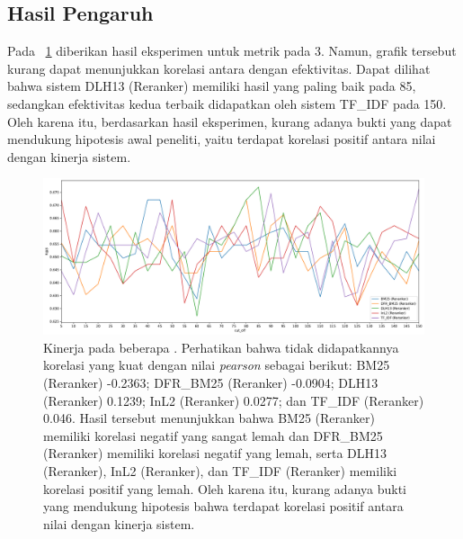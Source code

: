 \subsection{Hasil Pengaruh \Cutoff{}}
\label{subbab:5::Hasil Pengaruh Cut-off}
Pada \gambar{}~\ref{grafik:cutoff} diberikan hasil eksperimen untuk metrik \recall{} pada \cutoff{} 3. Namun, grafik tersebut kurang dapat menunjukkan korelasi antara \cutoff{} dengan efektivitas. Dapat dilihat bahwa sistem DLH13 (Reranker) memiliki hasil yang paling baik pada \cutoff{} 85, sedangkan efektivitas kedua terbaik didapatkan oleh sistem TF\_IDF pada \cutoff{} 150. Oleh karena itu, berdasarkan hasil eksperimen, kurang adanya bukti yang dapat mendukung hipotesis awal peneliti, yaitu terdapat korelasi positif antara nilai \cutoff{} dengan kinerja sistem.
\begin{landscape}
    \begin{figure}
        \centering
        \includegraphics[scale=0.6]{assets/pdfs/Cut Off Experiment Results_3.pdf}
        \caption{Kinerja pada beberapa \cutoff{}. Perhatikan bahwa tidak didapatkannya korelasi yang kuat dengan nilai \textit{pearson} sebagai berikut: BM25 (Reranker) -0.2363; DFR\_BM25 (Reranker) -0.0904; DLH13 (Reranker) 0.1239; InL2 (Reranker) 0.0277; dan TF\_IDF (Reranker) 0.046. Hasil tersebut menunjukkan bahwa BM25 (Reranker) memiliki korelasi negatif yang sangat lemah dan DFR\_BM25 (Reranker) memiliki korelasi negatif yang lemah, serta DLH13 (Reranker), InL2 (Reranker), dan TF\_IDF (Reranker) memiliki korelasi positif yang lemah. Oleh karena itu, kurang adanya bukti yang mendukung hipotesis bahwa terdapat korelasi positif antara nilai \cutoff{} dengan kinerja sistem.}
        \label{grafik:cutoff}
    \end{figure}
\end{landscape}





